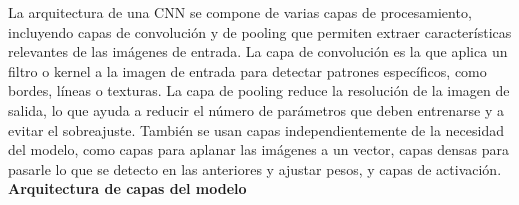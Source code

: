\documentclass[colorinlistoftodos,twoside,twocolumn,10pt]{article} %
\begin{document}
La arquitectura de una CNN se compone de varias capas de procesamiento, incluyendo capas de convoluci\'on y de pooling que permiten extraer caracter\'isticas relevantes de las im\'agenes de entrada. La capa de convoluci\'on es la que aplica un filtro o kernel a la imagen de entrada para detectar patrones espec\'ificos, como bordes, l\'ineas o texturas. La capa de pooling reduce la resoluci\'on de la imagen de salida, lo que ayuda a reducir el n\'umero de par\'ametros que deben entrenarse y a evitar el sobreajuste. Tambi\'en se usan capas independientemente de la necesidad del modelo, como capas para aplanar las im\'agenes a un vector, capas densas para pasarle lo que se detecto en las anteriores y ajustar pesos, y capas de activaci\'on.\\


\textbf{\large Arquitectura de capas del modelo}
\end{document}
